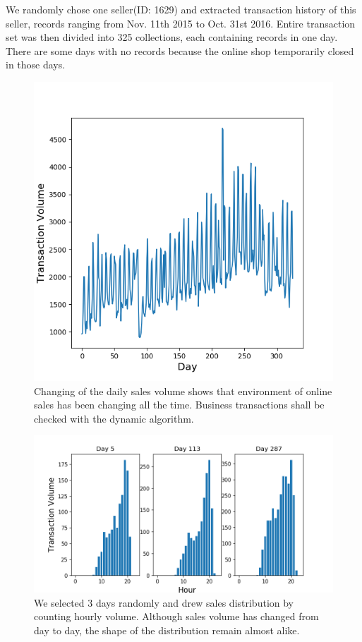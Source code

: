 \documentclass[10pt,conference,letterpaper]{IEEEtran}
\begin{document}
			We randomly chose one seller(ID: 1629) and extracted transaction history of this seller, records ranging from Nov. 11th 2015 to Oct. 31st 2016. Entire transaction set was then divided into 325 collections, each containing records in one day. There are some days with no records because the online shop temporarily closed in those days.
	
			\begin{figure}[!t]
				\centering
				\includegraphics[width=0.75\linewidth]{fig/DailyTransactionVolume.png}
				\caption{Changing of the daily sales volume shows that environment of online sales has been changing all the time. Business transactions shall be checked with the dynamic algorithm.}
				\label{fig:daily-transaction-volume}
			\end{figure}
	
			\begin{figure}[!t]
				\centering
				\includegraphics[width=\linewidth]{fig/SaleDistributions.png}
				\caption{We selected 3 days randomly and drew sales distribution by counting hourly volume. Although sales volume has changed from day to day, the shape of the distribution remain almost alike.}
				\label{fig:sale-distribution-sample}
			\end{figure}
	
\end{document}
